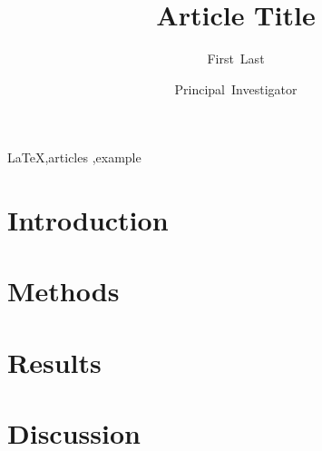 \documentclass[review,3p,authoryear]{elsarticle}
\begin{document}
\begin{frontmatter}
\title{Article Title}
\author[MAP]{First~Last}
\author[UT]{Principal~Investigator}
\address[MAP]{MAP Centre for Urban Health Solutions}
\address[UT]{University of Toronto}
\begin{abstract}
  
\end{abstract}
\begin{keyword}
  \LaTeX \sep articles \sep example
\end{keyword}
\end{frontmatter}
\clearpage
\section{Introduction}\label{s:intro}

\section{Methods}\label{s:methods}

\section{Results}\label{s:results}

\section{Discussion}\label{s:discussion}

\end{document}
